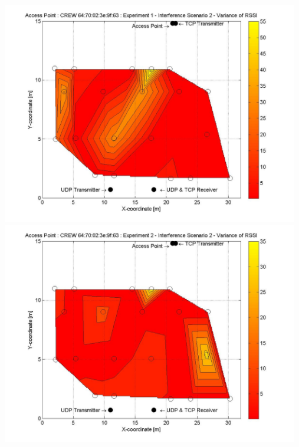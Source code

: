 \documentclass[11pt,a4paper,headinclude,footinclude,chapterprefix=on]{scrreprt}
\begin{document}
\begin{longtable}
	\includegraphics[width=13cm]{../../Source/plot/CREW_63/63_Wifi_Ex_1_Variance.jpg} \\
	\includegraphics[width=13cm]{../../Source/plot/CREW_63/63_Wifi_Ex_2_Variance.jpg} \\
\end{longtable}
\end{document}
